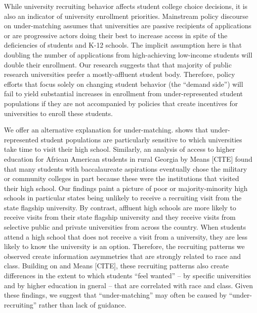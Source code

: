 \documentclass[twoside]{article}
\begin{document}
While university recruiting behavior affects student college choice decisions, it is also an indicator of university enrollment priorities.  Mainstream policy discourse on under-matching assumes that universities are passive recipients of applications or are progressive actors doing their best to increase access in spite of the deficiencies of students and K-12 schools.  The implicit assumption here is that doubling the number of applications from high-achieving low-income students will double their enrollment. Our research suggests that that majority of public research universities prefer a mostly-affluent student body. Therefore, policy efforts that focus solely on changing student behavior (the ``demand side'') will fail to yield substantial increases in enrollment from under-represented student populations if they are not accompanied by policies that create incentives for universities to enroll these students.


We offer an alternative explanation for under-matching. \cite{RN4324} shows that under-represented student populations are particularly sensitive to which universities take time to visit their high school. Similarly, an analysis of access to higher education for African American students in rural Georgia by Means [CITE] found that many students with baccalaureate aspirations eventually chose the military or community colleges in part because these were the institutions that visited their high school. Our findings paint a picture of poor or majority-minority high schools in particular states being unlikely to receive a recruiting visit from the state flagship university.  By contrast, affluent high schools are more likely to receive visits from their state flagship university and they receive visits from selective public and private universities from across the country.  When students attend a high school that does not receive a visit from a university, they are less likely to know the university is an option.  Therefore, the recruiting patterns we observed create information asymmetries that are strongly related to race and class.  Building on \cite{RN4324} and Means [CITE], these recruiting patterns also create differences in the extent to which students ``feel wanted'' -- by specific universities and by higher education in gneral -- that are correlated with race and class.  Given these findings, we suggest that ``under-matching'' may often be caused by ``under-recruiting'' rather than lack of guidance.
\end{document}
